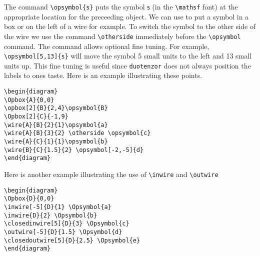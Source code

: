\documentclass[10pt]{article}
\begin{document}
The command \verb+\opsymbol{s}+ puts the symbol $\mathsf{s}$ (in the \verb+\mathsf+ font) at the appropriate location for the preceeding object.  We can use to put a symbol in a box or on the left of a wire for example. To switch the symbol to the other side of the wire we use the command \verb+\otherside+ immediately before the \verb+\opsymbol+ command.   The command allows optional fine tuning.  For example, \verb+\opsymbol[5,13]{s}+
will move the symbol 5 small units to the left and 13 small units up.  This fine tuning is useful since \verb+duotenzor+ does not always position the labels to ones taste.  Here is an example illustrating these points.
\newpage
\begin{verbatim}
\begin{diagram}
\Opbox{A}{0,0}
\opbox[2]{B}{2,4}\opsymbol{B}
\Opbox[2]{C}{-1,9}
\wire{A}{B}{2}{1}\opsymbol{a}
\wire{A}{B}{3}{2} \otherside \opsymbol{c}
\wire{A}{C}{1}{1}\opsymbol{b}
\wire{B}{C}{1.5}{2} \opsymbol[-2,-5]{d}
\end{diagram}
\end{verbatim}

\vspace{-13pt}
\noindent Here is another example illustrating the use of \verb+\inwire+ and \verb+\outwire+
\begin{verbatim}
\begin{diagram}
\Opbox{D}{0,0}
\inwire[-5]{D}{1} \Opsymbol{a}
\inwire{D}{2} \Opsymbol{b}
\closedinwire[5]{D}{3} \Opsymbol{c}
\outwire[-5]{D}{1.5} \Opsymbol{d}
\closedoutwire[5]{D}{2.5} \Opsymbol{e}
\end{diagram}
\end{verbatim}
\end{document}
